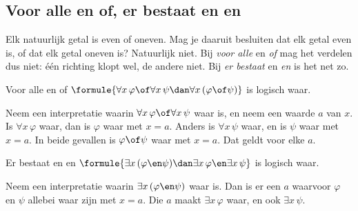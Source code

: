 \begin{oefeningen}
\end{oefeningen}

\subsection{Voor alle en of, er bestaat en en}

Elk natuurlijk getal is even of oneven. Mag je daaruit besluiten dat elk getal even is, of dat elk getal oneven is? Natuurlijk niet. Bij \textit{voor alle} en \textit{of} mag het verdelen dus niet: één richting klopt wel, de andere niet. Bij \textit{er bestaat} en \textit{en} is het net zo.

\begin{theorie}
\begin{stelling}{Voor alle en of}
\qquad $\formule{\forall x\, \varphi \of \forall x\, \psi \dan \forall x\, (\varphi \of \psi)}$ \qquad is logisch waar.
\end{stelling}

\begin{bewijs}
Neem een interpretatie waarin $\forall x\, \varphi \of \forall x\, \psi$ waar is, en neem een waarde $a$ van $x$. Is $\forall x\, \varphi$ waar, dan is $\varphi$ waar met $x = a$. Anders is $\forall x\, \psi$ waar, en is $\psi$ waar met $x = a$. In beide gevallen is $\varphi \of \psi$ waar met $x = a$. Dat geldt voor elke $a$.
\end{bewijs}

\begin{stelling}{Er bestaat en en}
\qquad $\formule{\exists x\, (\varphi \en \psi) \dan \exists x\, \varphi \en \exists x\, \psi}$ \qquad is logisch waar.
\end{stelling}

\begin{bewijs}
Neem een interpretatie waarin $\exists x\, (\varphi \en \psi)$ waar is. Dan is er een $a$ waarvoor $\varphi$ en $\psi$ allebei waar zijn met $x = a$. Die $a$ maakt $\exists x\, \varphi$ waar, en ook $\exists x\, \psi$.
\end{bewijs}
\end{theorie}


